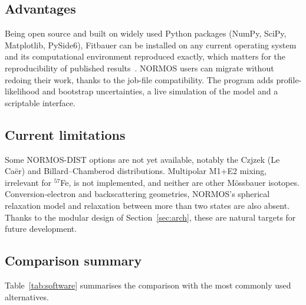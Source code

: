 \documentclass[smallcondensed]{svjour3}
\begin{document}
\subsection{Advantages}

Being open source and built on widely used Python packages (NumPy, SciPy,
Matplotlib, PySide6), Fitbauer can be installed on any current operating
system and its computational environment reproduced exactly, which matters
for the reproducibility of published results~\cite{Peng2011}. NORMOS users
can migrate without redoing their work, thanks to the job-file
compatibility. The program adds profile-likelihood and bootstrap
uncertainties, a live simulation of the model and a scriptable interface.

\subsection{Current limitations}

Some NORMOS-DIST options are not yet available, notably the Czjzek
(Le Ca\"{e}r) and Billard--Chamberod distributions.
Multipolar M1+E2 mixing, irrelevant for $^{57}$Fe, is not implemented, and
neither are other M\"{o}ssbauer isotopes. Conversion-electron and
backscattering geometries, NORMOS's spherical relaxation model and
relaxation between more than two states are also absent. Thanks to the modular design of Section~\ref{sec:arch}, these
are natural targets for future development.

\subsection{Comparison summary}

Table~\ref{tab:software} summarises the comparison with the most commonly
used alternatives.
\end{document}
